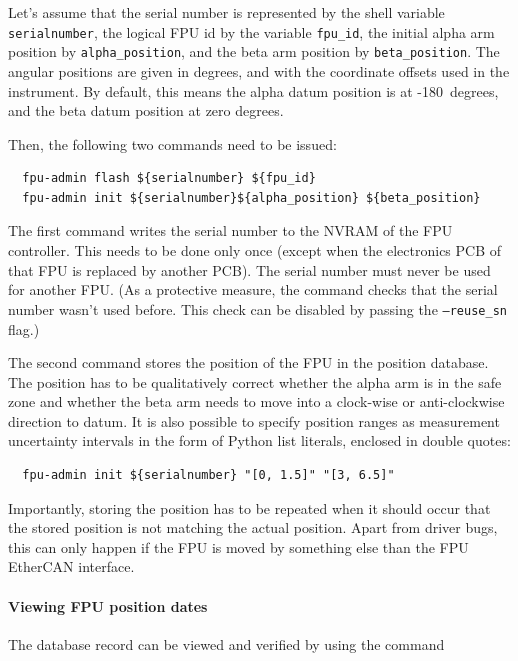 \documentclass[11pt,a4paper]{scrartcl}
\begin{document}
Let's assume that the serial number is represented by the shell
variable \texttt{serialnumber}, the logical FPU id by the variable
\texttt{fpu\_id}, the initial alpha arm position by
\texttt{alpha\_position}, and the beta arm position by
\texttt{beta\_position}. The angular positions are given in degrees,
and with the coordinate offsets used in the instrument. By default,
this means the alpha datum position is at -180\degree\ degrees, and the beta
datum position at zero degrees.

Then, the following two commands need to be issued:

\begin{verbatim}
  fpu-admin flash ${serialnumber} ${fpu_id}
  fpu-admin init ${serialnumber}${alpha_position} ${beta_position}
\end{verbatim}

The first command writes the serial number to the NVRAM of the FPU
controller. This needs to be done only once (except when the
electronics PCB of that FPU is replaced by another PCB). The serial
number must never be used for another FPU. (As a protective measure,
the command checks that the serial number wasn't used before. This
check can be disabled by passing the \texttt{--reuse\_sn} flag.)

The second command stores the position of the FPU in the position
database. The position has to be qualitatively correct whether the
alpha arm is in the safe zone and whether the beta arm needs to move
into a clock-wise or anti-clockwise direction to datum. It is also
possible to specify position ranges as measurement uncertainty
intervals in the form of Python list literals, enclosed in double
quotes:
\begin{verbatim}
  fpu-admin init ${serialnumber} "[0, 1.5]" "[3, 6.5]"
\end{verbatim}


Importantly, storing the position has to be repeated when it should
occur that the stored position is not matching the actual
position. Apart from driver bugs, this can only happen if the FPU is
moved by something else than the FPU EtherCAN interface.

\paragraph{Viewing FPU position dates}

The database record can be viewed and verified by using the command
\end{document}
